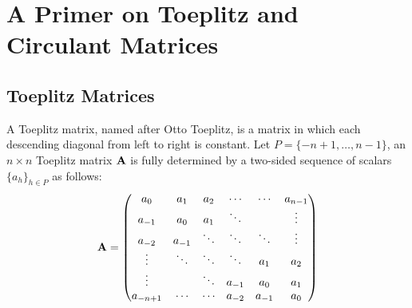 



\section{A Primer on Toeplitz and Circulant Matrices}
\label{section:ch2-a_primer_on_toeplitz_and_circulant_matrices}


\subsection{Toeplitz Matrices}
\label{subsection:ch2-toeplitz_matrices}

A Toeplitz matrix, named after Otto Toeplitz, is a matrix in which each descending diagonal from left to right is constant.
Let $P = \{-n+1, \dots, n-1\}$, an $n\times n$ Toeplitz matrix $\mathbf{A}$ is fully determined by a two-sided sequence of scalars $\{a_h\}_{h \in P}$ as follows:
\begin{equation}
  \mathbf{A} =
  \begin{pmatrix}
    a_0 & a_{1} & a_{2} & \cdots & \cdots & a_{n-1} \\
    a_{-1} & a_0 & a_{1} & \ddots & & \vdots \\
    a_{-2} & a_{-1} & \ddots & \ddots & \ddots & \vdots \\ 
    \vdots & \ddots & \ddots & \ddots & a_{1} & a_{2} \\
    \vdots & & \ddots & a_{-1} & a_{0} & a_{1} \\
    a_{-n+1} & \cdots & \cdots & a_{-2} & a_{-1} & a_0
  \end{pmatrix}
\end{equation}

